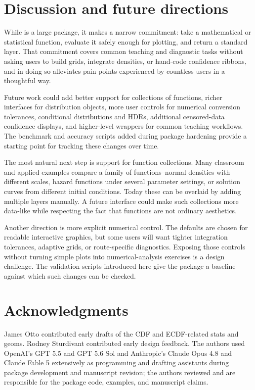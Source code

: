 \section{Discussion and future directions}\label{discussion-and-future-directions}

While  is a large package, it makes a narrow commitment: take a mathematical or statistical
function, evaluate it safely enough for plotting, and return a standard
 layer. That commitment covers common teaching and diagnostic
tasks without asking users to build grids, integrate densities, or hand-code
confidence ribbons, and in doing so alleviates pain points experienced by
countless  users in a thoughtful way.

Future work could add better support for collections of functions, richer
interfaces for distribution objects, more user controls for numerical
conversion tolerances, conditional distributions and HDRs, additional
censored-data confidence displays, and higher-level wrappers for common
teaching workflows.
The benchmark and accuracy scripts added during package hardening provide a
starting point for tracking these changes over time.

The most natural next step is support for function collections. Many classroom
and applied examples compare a family of functions--normal densities with
different scales, hazard functions under several parameter settings, or
solution curves from different initial conditions. Today these can be overlaid
by adding multiple layers manually. A future interface could make such
collections more data-like while respecting the fact that functions are not
ordinary aesthetics.

Another direction is more explicit numerical control. The defaults are chosen
for readable interactive graphics, but some users will want tighter integration
tolerances, adaptive grids, or route-specific diagnostics. Exposing those
controls without turning simple plots into numerical-analysis exercises is a
design challenge. The validation scripts introduced here give the package a
baseline against which such changes can be checked.

\section{Acknowledgments}\label{acknowledgments}

James Otto contributed early drafts of the CDF and ECDF-related stats and
geoms. Rodney Sturdivant contributed early design feedback. The authors used
OpenAI's GPT 5.5 and GPT 5.6 Sol and Anthropic's Claude Opus 4.8 and Claude
Fable 5 extensively as programming and
drafting assistants during package development and manuscript revision; the
authors reviewed and are responsible for the package code, examples, and
manuscript claims.

